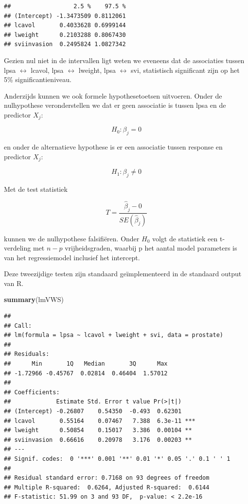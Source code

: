 \documentclass[
  12pt,dutch]{book}
\newenvironment{Shaded}{\begin{snugshade}}{\end{snugshade}}
\newcommand{\FunctionTok}[1]{\textcolor[rgb]{0.13,0.29,0.53}{\textbf{#1}}}
\newcommand{\NormalTok}[1]{#1}
\theoremstyle{definition}
\theoremstyle{definition}
\theoremstyle{definition}
\theoremstyle{definition}
\theoremstyle{remark}
\begin{document}
\begin{verbatim}
##                  2.5 %    97.5 %
## (Intercept) -1.3473509 0.8112061
## lcavol       0.4033628 0.6999144
## lweight      0.2103288 0.8067430
## sviinvasion  0.2495824 1.0827342
\end{verbatim}

Gezien nul niet in de intervallen ligt weten we eveneens dat de associaties tussen lpsa \(\leftrightarrow\) lcavol, lpsa \(\leftrightarrow\) lweight, lpsa \(\leftrightarrow\) svi, statistisch significant zijn op het 5\% significantieniveau.

Anderzijds kunnen we ook formele hypothesetoetsen uitvoeren. Onder de nulhypothese veronderstellen we dat er geen associatie is tussen lpsa en de predictor \(X_j\):

\[H_0: \beta_j=0\]

en onder de alternatieve hypothese is er een associatie tussen response en predictor \(X_j\):

\[H_1: \beta_j\neq0\]

Met de test statistiek

\[T=\frac{\hat{\beta}_j-0}{SE(\hat{\beta}_j)}\]

kunnen we de nulhypothese falsifiëren. Onder \(H_0\) volgt de statistiek een t-verdeling met \(n-p\) vrijheidsgraden, waarbij p het aantal model parameters is van het regressiemodel inclusief het intercept.

Deze tweezijdige testen zijn standaard geïmplementeerd in de standaard output van R.

\begin{Shaded}
\begin{Highlighting}[]
\FunctionTok{summary}\NormalTok{(lmVWS)}
\end{Highlighting}
\end{Shaded}

\begin{verbatim}
## 
## Call:
## lm(formula = lpsa ~ lcavol + lweight + svi, data = prostate)
## 
## Residuals:
##      Min       1Q   Median       3Q      Max 
## -1.72966 -0.45767  0.02814  0.46404  1.57012 
## 
## Coefficients:
##             Estimate Std. Error t value Pr(>|t|)    
## (Intercept) -0.26807    0.54350  -0.493  0.62301    
## lcavol       0.55164    0.07467   7.388  6.3e-11 ***
## lweight      0.50854    0.15017   3.386  0.00104 ** 
## sviinvasion  0.66616    0.20978   3.176  0.00203 ** 
## ---
## Signif. codes:  0 '***' 0.001 '**' 0.01 '*' 0.05 '.' 0.1 ' ' 1
## 
## Residual standard error: 0.7168 on 93 degrees of freedom
## Multiple R-squared:  0.6264, Adjusted R-squared:  0.6144 
## F-statistic: 51.99 on 3 and 93 DF,  p-value: < 2.2e-16
\end{verbatim}
\end{document}
